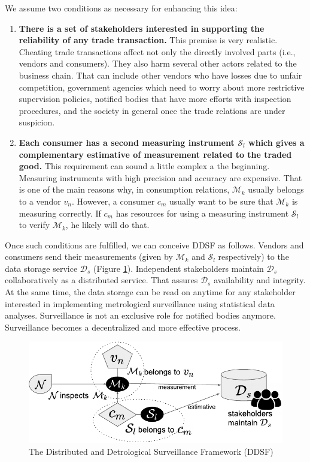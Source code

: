 \documentclass[sigplan]{acmart}
\begin{document}
We assume two conditions as necessary for enhancing this idea:
\begin{enumerate}
 \item \textbf{There is a set of stakeholders interested in supporting the reliability of any trade transaction.} 
  This premise is very realistic. 
  Cheating trade transactions affect not only the directly involved parts (i.e., vendors and consumers).
  They also harm several other actors related to the business chain.
  That can include other vendors who have losses due to unfair competition, government agencies which need to worry about more restrictive supervision policies, notified bodies that have more efforts with inspection procedures, and the society in general once the trade relations are under suspicion.
 \item \textbf{Each consumer has a second measuring instrument $\mathcal{S}_l$ which gives a complementary estimative of measurement    related to the traded good.}
  This requirement can sound a little complex a the beginning.
  Measuring instruments with high precision and accuracy are expensive.
  That is one of the main reasons why, in consumption relations, $\mathcal{M}_k$ usually belongs to a vendor $v_n$.
  However, a consumer $c_m$ usually want to be sure that $\mathcal{M}_k$ is measuring correctly.
  If $c_m$ has resources for using a measuring instrument $\mathcal{S}_l$ to verify $\mathcal{M}_k$, he likely will do that.
\end{enumerate}

Once such conditions are fulfilled, we can conceive DDSF as follows.
Vendors and consumers send their measurements (given by $\mathcal{M}_k$ and $\mathcal{S}_l$ respectively) to the data storage service $\mathcal{D}_s$ (Figure \ref{f:basicframe2}).
Independent stakeholders maintain $\mathcal{D}_s$ collaboratively as a distributed service.
That assures $\mathcal{D}_s$ availability and integrity.
At the same time, the data storage can be read on anytime for any stakeholder interested in implementing metrological surveillance using statistical data analyses.
Surveillance is not an exclusive role for notified bodies anymore.
Surveillance becomes a decentralized and more effective process.

\begin{figure}[!t]
\centering
\includegraphics[width=.4\textwidth]{basicframe2}
\caption{The Distributed and Detrological Surveillance Framework (DDSF)}
\label{f:basicframe2}
\end{figure}
\end{document}
